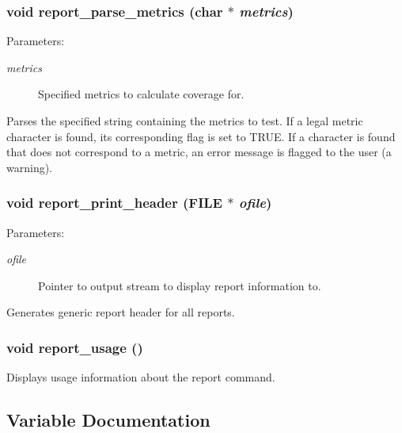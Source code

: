 \subsubsection{\setlength{\rightskip}{0pt plus 5cm}void report\_\-parse\_\-metrics (char $\ast$ {\em metrics})}\label{report_8c_a13}


\begin{Desc}
\item[Parameters:]
\begin{description}
\item[{\em metrics}]Specified metrics to calculate coverage for.\end{description}
\end{Desc}
Parses the specified string containing the metrics to test. If a legal metric character is found, its corresponding flag is set to TRUE. If a character is found that does not correspond to a metric, an error message is flagged to the user (a warning). 
\subsubsection{\setlength{\rightskip}{0pt plus 5cm}void report\_\-print\_\-header (FILE $\ast$ {\em ofile})}\label{report_8c_a17}


\begin{Desc}
\item[Parameters:]
\begin{description}
\item[{\em ofile}]Pointer to output stream to display report information to.\end{description}
\end{Desc}
Generates generic report header for all reports. 
\subsubsection{\setlength{\rightskip}{0pt plus 5cm}void report\_\-usage ()}\label{report_8c_a12}


Displays usage information about the report command. 

\subsection{Variable Documentation}
